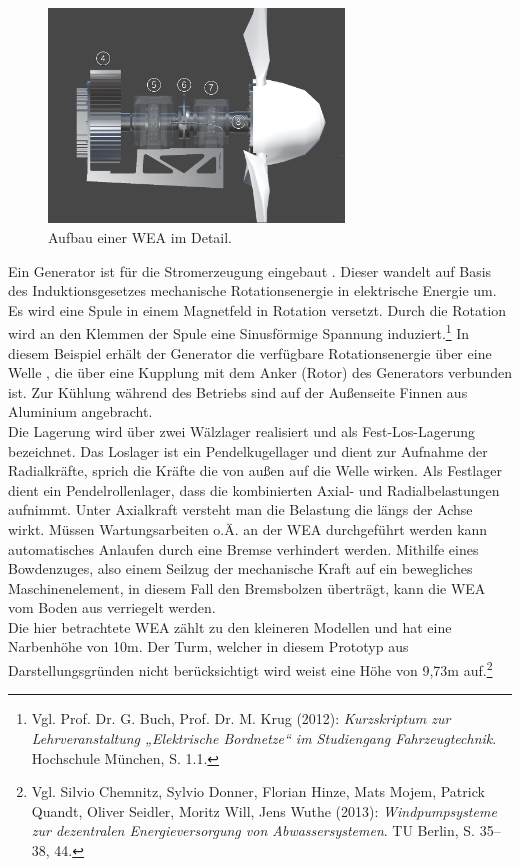 \begin{figure}[H]
	\centering
	\captionsetup{width=0.7\textwidth}
	\includegraphics[keepaspectratio, width=0.7\textwidth]{bildquellen/WEA2_2}
	\caption{Aufbau einer WEA im Detail.}
	\label{fig:2}
\end{figure}

Ein Generator ist für die Stromerzeugung eingebaut . Dieser wandelt auf Basis des Induktionsgesetzes mechanische Rotationsenergie in elektrische Energie um. Es wird eine Spule in einem Magnetfeld in Rotation versetzt. Durch die Rotation wird an den Klemmen der Spule eine Sinusförmige Spannung induziert.\footnote{Vgl. Prof. Dr. G. Buch, Prof. Dr. M. Krug  (2012): \textit{Kurzskriptum zur Lehrveranstaltung „Elektrische Bordnetze“ im Studiengang Fahrzeugtechnik}. Hochschule München, S. 1.1.} In diesem Beispiel erhält der Generator die verfügbare Rotationsenergie über eine Welle , die über eine Kupplung mit dem Anker (Rotor) des Generators verbunden ist. Zur Kühlung während des Betriebs sind auf der Außenseite Finnen aus Aluminium angebracht.\\
Die Lagerung wird über zwei Wälzlager realisiert und als Fest-Los-Lagerung bezeichnet. Das Loslager ist ein Pendelkugellager  und dient zur Aufnahme der Radialkräfte, sprich die Kräfte die von außen auf die Welle wirken. Als Festlager dient ein Pendelrollenlager,  dass die kombinierten Axial- und Radialbelastungen aufnimmt. Unter Axialkraft versteht man die Belastung die längs der Achse wirkt.
Müssen Wartungsarbeiten o.Ä. an der WEA durchgeführt werden kann automatisches Anlaufen durch eine Bremse  verhindert werden. Mithilfe eines Bowdenzuges, also einem Seilzug der mechanische Kraft auf ein bewegliches Maschinenelement, in diesem Fall den Bremsbolzen überträgt, kann die WEA vom Boden aus verriegelt werden. \\
Die hier betrachtete WEA zählt zu den kleineren Modellen und hat eine Narbenhöhe von 10m. Der Turm, welcher in diesem Prototyp aus Darstellungsgründen nicht berücksichtigt wird weist eine Höhe von 9,73m auf.\footnote{Vgl. Silvio Chemnitz, Sylvio Donner, Florian Hinze, Mats Mojem, Patrick Quandt, Oliver Seidler, Moritz Will, Jens Wuthe (2013): \textit{Windpumpsysteme zur dezentralen Energieversorgung von Abwassersystemen}. TU Berlin, S. 35--38, 44.} 
   



